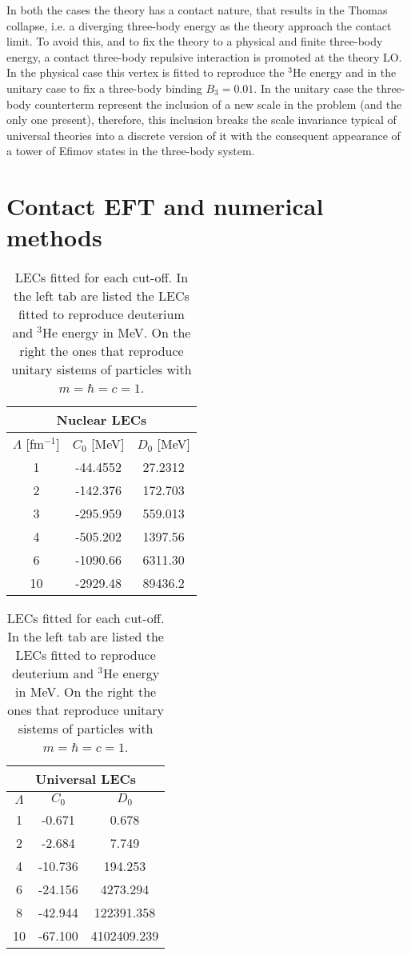 \documentclass[aps,onecolumn,preprintnumbers,amsmath,amssymb,nofootinbib,superscriptaddress,notitlepage]{revtex4-1}
\begin{document}
In both the cases the theory has a contact nature, that results in the Thomas collapse, i.e. a diverging three-body energy as the theory approach the contact limit.
To avoid this, and to fix the theory to a physical and finite three-body energy, a contact three-body repulsive interaction is promoted at the theory LO.
In the physical case this vertex is fitted to reproduce the $^3$He energy and in the unitary case to fix a three-body binding $B_3=0.01$.
In the unitary case the three-body counterterm represent the inclusion of a new scale in the problem (and the only one present), therefore, this inclusion breaks the scale invariance typical of universal theories into a discrete version of it with the consequent appearance of a tower of Efimov states in the three-body system.



\section{Contact EFT and numerical methods}

\begin{table}[]
    \centering
    \begin{tabular}{|ccc|}
    \hline
    \multicolumn{3}{|c|}{Nuclear LECs}\\
    \hline
         $\Lambda$ [fm$^{-1}$] & $C_0$ [MeV] & $D_0$ [MeV] \\
1   &	-44.4552	&	27.2312 \\
2	&   -142.376	&	172.703 \\
3	&   -295.959	&	559.013 \\
4	&   -505.202	&	1397.56 \\
6	&   -1090.66	&	6311.30 \\
10	&   -2929.48	&	89436.2 \\
    \hline
    \end{tabular}
    \quad
\begin{tabular}{|ccc|}
    \hline
    \multicolumn{3}{|c|}{Universal LECs}\\
    \hline        
        $\Lambda$  & $C_0$  & $D_0$  \\
1	&   -0.671	&	0.678 \\
2	&   -2.684	&	7.749 \\
4	&   -10.736	&	194.253 \\
6	&   -24.156	&	4273.294 \\
8	&   -42.944	&	122391.358 \\
10	&   -67.100	&	4102409.239 \\
    \hline
\end{tabular}
    \caption{LECs fitted for each cut-off. In the left tab are listed the LECs fitted to reproduce deuterium and $^3$He energy in MeV. On the right the ones that reproduce unitary sistems of particles with $m=\hbar=c=1$.}
    \label{tab:my_label}
\end{table}
\end{document}
